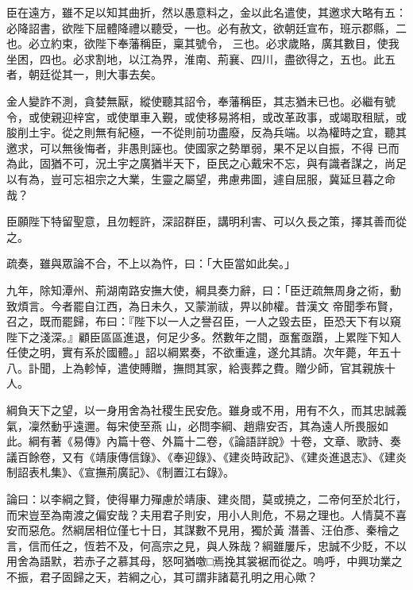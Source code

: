 \begin{pinyinscope}
 臣在遠方，雖不足以知其曲折，然以愚意料之，金以此名遣使，其邀求大略有五：必降詔書，欲陛下屈體降禮以聽受，一也。必有赦文，欲朝廷宣布，班示郡縣，二也。必立約束，欲陛下奉藩稱臣，稟其號令，
 三也。必求歲賂，廣其數目，使我坐困，四也。必求割地，以江為界，淮南、荊襄、四川，盡欲得之，五也。此五者，朝廷從其一，則大事去矣。



 金人變詐不測，貪婪無厭，縱使聽其詔令，奉藩稱臣，其志猶未已也。必繼有號令，或使親迎梓宮，或使單車入覲，或使移易將相，或改革政事，或竭取租賦，或朘削土宇。從之則無有紀極，一不從則前功盡廢，反為兵端。以為權時之宜，聽其邀求，可以無後悔者，非愚則誣也。使國家之勢單弱，果不足以自振，不得
 已而為此，固猶不可，況土宇之廣猶半天下，臣民之心戴宋不忘，與有識者謀之，尚足以有為，豈可忘祖宗之大業，生靈之屬望，弗慮弗圖，遽自屈服，冀延旦暮之命哉？



 臣願陛下特留聖意，且勿輕許，深詔群臣，講明利害、可以久長之策，擇其善而從之。



 疏奏，雖與眾論不合，不上以為忤，曰：「大臣當如此矣。」



 九年，除知潭州、荊湖南路安撫大使，綱具奏力辭，曰：「臣迂疏無周身之術，動致煩言。今者罷自江西，為日未久，又蒙湔祓，畀以帥權。昔漢文
 帝聞季布賢，召之，既而罷歸，布曰：『陛下以一人之譽召臣，一人之毀去臣，臣恐天下有以窺陛下之淺深。』顧臣區區進退，何足少多。然數年之間，亟奮亟躓，上累陛下知人任使之明，實有系於國體。」詔以綱累奏，不欲重違，遂允其請。次年薨，年五十八。訃聞，上為軫悼，遣使賻贈，撫問其家，給喪葬之費。贈少師，官其親族十人。



 綱負天下之望，以一身用舍為社稷生民安危。雖身或不用，用有不久，而其忠誠義氣，凜然動乎遠邇。每宋使至燕
 山，必問李綱、趙鼎安否，其為遠人所畏服如此。綱有著《易傳》內篇十卷、外篇十二卷，《論語詳說》十卷，文章、歌詩、奏議百餘卷，又有《靖康傳信錄》、《奉迎錄》、《建炎時政記》、《建炎進退志》、《建炎制詔表札集》、《宣撫荊廣記》、《制置江右錄》。



 論曰：以李綱之賢，使得畢力殫慮於靖康、建炎間，莫或撓之，二帝何至於北行，而宋豈至為南渡之偏安哉？夫用君子則安，用小人則危，不易之理也。人情莫不喜安而惡危。然綱居相位僅七十日，其謀數不見用，獨於黃
 潛善、汪伯彥、秦檜之言，信而任之，恆若不及，何高宗之見，與人殊哉？綱雖屢斥，忠誠不少貶，不以用舍為語默，若赤子之慕其母，怒呵猶噭□焉挽其裳裾而從之。嗚呼，中興功業之不振，君子固歸之天，若綱之心，其可謂非諸葛孔明之用心歟？



\end{pinyinscope}